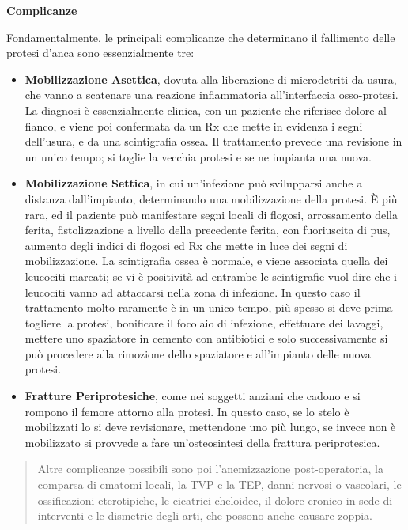 \documentclass[]{article}
\begin{document}
\textbf{Complicanze}

Fondamentalmente, le principali complicanze che determinano il
fallimento delle protesi d'anca sono essenzialmente tre:

\begin{itemize}
\item
  \textbf{Mobilizzazione Asettica}, dovuta alla liberazione di
  microdetriti da usura, che vanno a scatenare una reazione
  infiammatoria all'interfaccia osso-protesi. La diagnosi è
  essenzialmente clinica, con un paziente che riferisce dolore al
  fianco, e viene poi confermata da un Rx che mette in evidenza i segni
  dell'usura, e da una scintigrafia ossea. Il trattamento prevede una
  revisione in un unico tempo; si toglie la vecchia protesi e se ne
  impianta una nuova.
\end{itemize}

\begin{itemize}
\item
  \textbf{Mobilizzazione Settica}, in cui un'infezione può svilupparsi
  anche a distanza dall'impianto, determinando una mobilizzazione della
  protesi. È più rara, ed il paziente può manifestare segni locali di
  flogosi, arrossamento della ferita, fistolizzazione a livello della
  precedente ferita, con fuoriuscita di pus, aumento degli indici di
  flogosi ed Rx che mette in luce dei segni di mobilizzazione. La
  scintigrafia ossea è normale, e viene associata quella dei leucociti
  marcati; se vi è positività ad entrambe le scintigrafie vuol dire che
  i leucociti vanno ad attaccarsi nella zona di infezione. In questo
  caso il trattamento molto raramente è in un unico tempo, più spesso si
  deve prima togliere la protesi, bonificare il focolaio di infezione,
  effettuare dei lavaggi, mettere uno spaziatore in cemento con
  antibiotici e solo successivamente si può procedere alla rimozione
  dello spaziatore e all'impianto delle nuova protesi.
\item
  \textbf{Fratture Periprotesiche}, come nei soggetti anziani che cadono
  e si rompono il femore attorno alla protesi. In questo caso, se lo
  stelo è mobilizzati lo si deve revisionare, mettendone uno più lungo,
  se invece non è mobilizzato si provvede a fare un'osteosintesi della
  frattura periprotesica.
\end{itemize}

\begin{quote}
Altre complicanze possibili sono poi l'anemizzazione post-operatoria, la
comparsa di ematomi locali, la TVP e la TEP, danni nervosi o vascolari,
le ossificazioni eterotipiche, le cicatrici cheloidee, il dolore cronico
in sede di interventi e le dismetrie degli arti, che possono anche
causare zoppia.
\end{quote}
\end{document}
